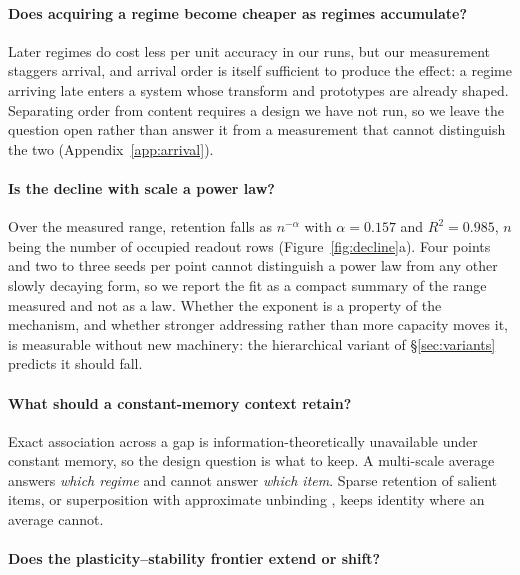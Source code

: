 \documentclass[11pt,a4paper]{article}
\begin{document}
\paragraph{Does acquiring a regime become cheaper as regimes accumulate?}
Later regimes do cost less per unit accuracy in our runs, but our measurement
staggers arrival, and arrival order is itself sufficient to produce the effect:
a regime arriving late enters a system whose transform and prototypes are
already shaped. Separating order from content requires a design we have not
run, so we leave the question open rather than answer it from a measurement
that cannot distinguish the two (Appendix~\ref{app:arrival}).

\paragraph{Is the decline with scale a power law?}
Over the measured range, retention falls as $n^{-\alpha}$ with $\alpha=0.157$
and $R^2=0.985$, $n$ being the number of occupied readout rows
(Figure~\ref{fig:decline}a). Four points and two to three seeds per point
cannot distinguish a power law from any other slowly decaying form, so we
report the fit as a compact summary of the range measured and not as a law.
Whether the exponent is a property of the mechanism, and whether stronger
addressing rather than more capacity moves it, is measurable without new
machinery: the hierarchical variant of \S\ref{sec:variants} predicts it should
fall.

\paragraph{What should a constant-memory context retain?}
Exact association across a gap is information-theoretically unavailable under
constant memory, so the design question is what to keep. A multi-scale average
answers \emph{which regime} and cannot answer \emph{which item}. Sparse
retention of salient items, or superposition with approximate unbinding
\citep{plate1995holographic,ba2016using}, keeps identity where an average
cannot.

\paragraph{Does the plasticity--stability frontier extend or shift?}
\end{document}
